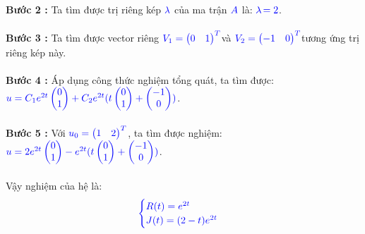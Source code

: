 \documentclass[a4paper]{article}
\begin{document}
{\bfseries Bước 2 :} Ta tìm được trị riêng kép $\textcolor{blue}{\lambda}$ của ma trận $\textcolor{blue}{A}$ là: $\textcolor{blue}{\lambda}$$\textcolor{blue}{=2}$.\\\\
{\bfseries Bước 3 :} Ta tìm được vector riêng \enskip $\textcolor{blue}{V\sb{1} = \begin{pmatrix} 0 & 1 \end{pmatrix}\sp{T}}$\enskip và \enskip $\textcolor{blue}{V\sb{2} = \begin{pmatrix} -1 & 0 \end{pmatrix}\sp{T}}$\enskip tương ứng trị riêng kép này.\\\\
{\bfseries Bước 4 :} Áp dụng công thức nghiệm tổng quát, ta tìm được:
$\textcolor{blue}{u = C\sb{1} e\sp{2t}\begin{pmatrix} 0 \\ 1 \end{pmatrix} + C\sb{2} e\sp{2t}(t\begin{pmatrix} 0 \\ 1 \end{pmatrix} + \begin{pmatrix} -1 \\ 0 \end{pmatrix})}$.\\\\
{\bfseries Bước 5 :} Với $\textcolor{blue}{u\sb{0} = \begin{pmatrix} 1 & 2 \end{pmatrix}\sp{T}}$, ta tìm được nghiệm: $\textcolor{blue}{u = 2 e\sp{2t}\begin{pmatrix} 0 \\ 1 \end{pmatrix} - e\sp{2t}(t\begin{pmatrix} 0 \\ 1 \end{pmatrix} + \begin{pmatrix} -1 \\ 0 \end{pmatrix})}$.\\\\
Vậy nghiệm của hệ là:
\begin{align}
	    \textcolor{blue}{
	    \begin{cases}
            R(t)=e\sp{2t}\\
            J(t)=(2 - t)e\sp{2t}
        \end{cases}
        }
\notag
	\end{align}
 
\end{document}
